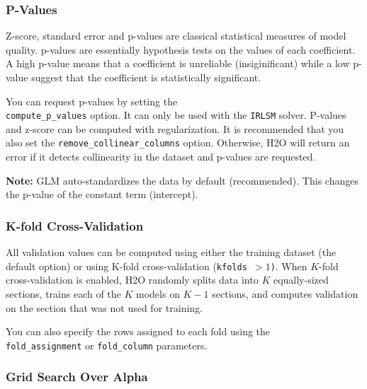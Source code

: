 \waterExampleInR



\subsubsection{P-Values}
Z-score, standard error and p-values are classical statistical measures of model quality. p-values are essentially
hypothesis tests on the values of each coefficient. A high p-value means that a coefficient is unreliable
(insiginificant) while a low p-value suggest that the coefficient is statistically significant.

You can request p-values by setting the \\\texttt{compute\_p\_values} option. It can only be used with the
\texttt{IRLSM} solver. P-values and z-score can be computed with regularization. It is recommended that you also set the \texttt{remove\_collinear\_columns} option. Otherwise, H2O will return an error if it detects collinearity in the dataset and p-values are requested. 

\textbf{Note:} GLM auto-standardizes the data by default (recommended). This changes the p-value of the constant term
(intercept).

\waterExampleInR



\subsubsection{K-fold Cross-Validation}

All validation values can be computed using either the training dataset (the default option) or using K-fold
cross-validation (\texttt{kfolds $> 1$)}. When $K$-fold cross-validation is enabled, H2O randomly splits data into $K$
equally-sized sections, trains each of the $K$ models on $K-1$ sections, and computes validation on the section that was not
used for training.

You can also specify the rows assigned to each fold using the\\ \texttt{fold\_assignment}
or \texttt{fold\_column} parameters.

\waterExampleInR


\waterExampleInPython


\newpage
\subsubsection{Grid Search Over Alpha}

